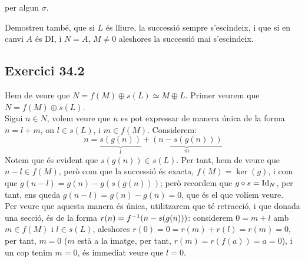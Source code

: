\documentclass[11pt, a4paper]{article}
\begin{document}
\begin{tcolorbox}[title=\section{Exercici 34}]
\begin{enumerate}
\begin{center}
\end{center}
per algun $\sigma$.
\end{enumerate}
Demostreu també, que si $L$ és lliure, la successió sempre s'escindeix, i que si en canvi $A$ és DI, i $N=A$, $M\neq 0$ aleshores la successió mai s'escindeix.
\end{tcolorbox}
\subsection{Exercici 34.2}
Hem de veure que $N=f(M)\oplus s(L)\simeq M\oplus L$. Primer veurem que $N=f(M)\oplus s(L)$.\\
Sigui $n\in N$, volem veure que $n$ es pot expressar de manera única de la forma $n=l+m$, on $l\in s(L)$, i $m\in f(M)$. Considerem:
\[
    n = \underbrace{s(g(n))}_{l} + \underbrace{(n-s(g(n)))}_{m}
\]
Notem que és evident que $s(g(n))\in s(L)$. Per tant, hem de veure que $n-l\in f(M)$, però com que la successió és exacta, $f(M)=\ker(g)$, i com que $g(n-l)=g(n)-g(s(g(n)))$; però recordem que $g\circ s =\mathrm{Id}_N$, per tant, ens queda $g(n-l)=g(n)-g(n)=0$, que és el que volíem veure.\\
\sloppy
Per veure que aquesta manera és única, utilitzarem que té retracció, i que donada una secció, és de la forma $r(n)=f^{-1}(n-s(g(n)))$: considerem $0=m+l$ amb $m\in f(M)$ i $l\in s(L)$, aleshores $r(0)=0=r(m)+r(l)=r(m)=0$, per tant, $m=0$ ($m$ està a la imatge, per tant, $r(m)=r(f(a))=a=0$), i un cop tenim $m=0$, és immediat veure que $l=0$.

\par
\end{document}

